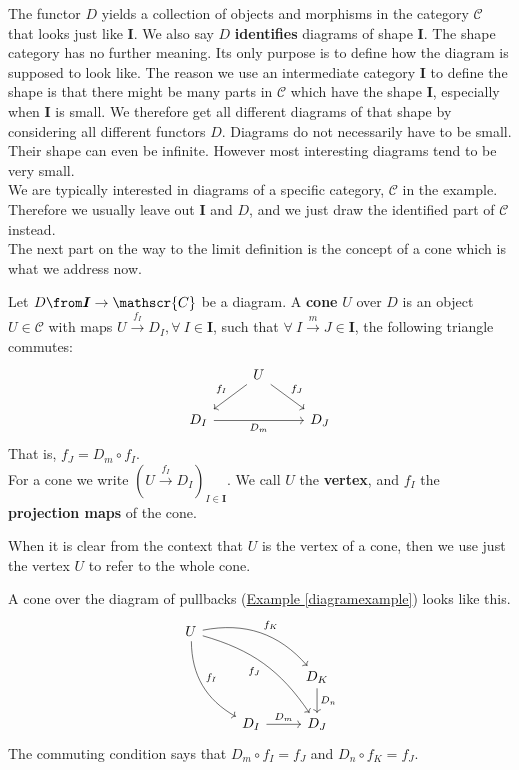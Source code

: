 The functor $D$ yields
a collection of objects and morphisms in the category $\mathscr C$
that looks just like $\bm I$.
We also say $D$ \textbf{identifies} diagrams of shape $\bm I$.
The shape category has no further meaning. Its only purpose
is to define how the diagram is supposed to look like.
The reason we use an intermediate
category $\bm I$ to define the shape is that
there might be many parts in $\mathscr C$ which have the shape $\bm I$,
especially when $\bm I$ is small.
We therefore get all different diagrams of that shape by considering
all different functors $D$.
Diagrams do not necessarily have to be small. Their shape can even be infinite.
However most interesting diagrams tend to be very small.\\
We are typically interested in diagrams of a specific category,
$\mathscr C$ in the example. Therefore we usually leave out $\bm I$ and $D$,
and we just draw the identified part of $\mathscr C$ instead.\\
The next part on the way to the limit definition is the concept of a cone which
is what we address now.
\begin{definition}
  Let $D \from \bm{I} \to \mathscr{C}$ be a diagram.
  A \textbf{cone} $U$ over $D$ is an object $U \in \mathscr{C}$
  with maps $U \overset{f_I}{\rightarrow} D_I, \forall\ I \in \bm{I}$, such that
  $\forall\ I \overset{m}{\to} J \in \bm{I}$, the following triangle commutes:
  \[
    \begin{tikzcd}
      & U \arrow[dl, swap, "f_I"] \arrow{dr}{f_J}&\\
      D_I \arrow[rr, swap, "D_m"] & & D_J
    \end{tikzcd}
  \]
  That is, $f_J = D_m \circ f_I$.\\
  For a cone we write $(U \overset{f_I}{\to} D_I)_{I\in \bm{I}}$.
  We call $U$ the \textbf{vertex}, and $f_I$ the \textbf{projection maps} of the cone.
\end{definition}
\begin{remark}
  When it is clear from the context that $U$ is the vertex of a cone, then we use just
  the vertex $U$ to refer to the whole cone.
\end{remark}
\begin{example}
  A cone over the diagram of pullbacks
  (\hyperref[diagramexample]{Example \ref*{diagramexample}}) looks like this.
  \[
    \begin{tikzcd}
      U \arrow[bend right=30]{ddr}{f_I} \arrow[bend left=30]{drr}{f_K} \arrow[bend left=20, swap]{ddrr}{f_J}&   &\\
      & & D_K \arrow{d}{D_n} \\
      & D_I \arrow{r}{D_m} & D_J
    \end{tikzcd}
  \]
  The commuting condition says that $D_m \circ f_I = f_J$ and $D_n \circ f_K = f_J$.
\end{example}

